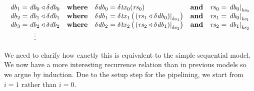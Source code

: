 \documentclass[11pt,a4paper]{article}
\newcommand\restrict[2]{\left.#1\right|_{#2}}
\begin{document}
\begin{center}
\begin{equation*}
\begin{array}{c@{\quad}l@{\quad}l}
    \mathit{db}_1 = \mathit{db}_0 \triangleleft \delta\mathit{db}_0
  & \mathbf{where} \quad \delta\mathit{db}_0 = \delta\mathit{tx}_0(\mathit{rs}_0)
  & \mathbf{and}   \quad \mathit{rs}_0 = \restrict{\mathit{db}_0}{\mathit{ks}_0}
\\
    \mathit{db}_2 = \mathit{db}_1 \triangleleft \delta\mathit{db}_1
  & \mathbf{where} \quad \delta\mathit{db}_1 = \delta\mathit{tx}_1\left(\restrict{(\mathit{rs}_1 \triangleleft \delta\mathit{db}_0)}{\mathit{ks}_1}\right)
  & \mathbf{and}   \quad \mathit{rs}_1 = \restrict{\mathit{db}_0}{\mathit{ks}_1}
\\
    \mathit{db}_3 = \mathit{db}_2 \triangleleft \delta\mathit{db}_2
  & \mathbf{where} \quad \delta\mathit{db}_2 = \delta\mathit{tx}_2\left(\restrict{(\mathit{rs}_2 \triangleleft \delta\mathit{db}_1)}{\mathit{ks}_2}\right)
  & \mathbf{and}   \quad \mathit{rs}_2 = \restrict{\mathit{db}_1}{\mathit{ks}_2}
\\
 \vdots
\end{array}
\end{equation*}
\end{center}
We need to clarify how exactly this is equivalent to the simple sequential
model. We now have a more interesting recurrence relation than in previous
models so we argue by induction. Due to the setup step for the pipelining, we
start from $i=1$ rather than $i=0$.
\end{document}
